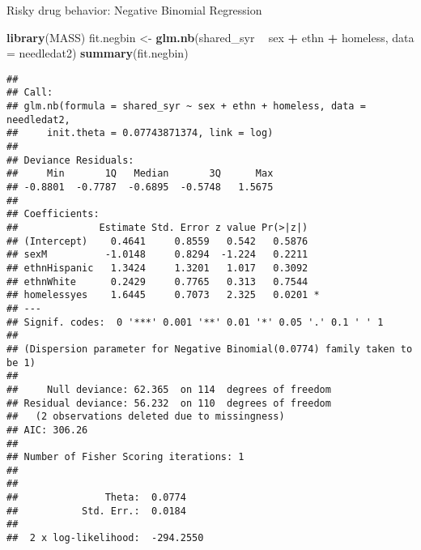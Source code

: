 \documentclass[
  ignorenonframetext,
]{beamer}
\newenvironment{Shaded}{\begin{snugshade}}{\end{snugshade}}
\newcommand{\DataTypeTok}[1]{\textcolor[rgb]{0.13,0.29,0.53}{#1}}
\newcommand{\KeywordTok}[1]{\textcolor[rgb]{0.13,0.29,0.53}{\textbf{#1}}}
\newcommand{\NormalTok}[1]{#1}
\newcommand{\OperatorTok}[1]{\textcolor[rgb]{0.81,0.36,0.00}{\textbf{#1}}}
\newcommand{\StringTok}[1]{\textcolor[rgb]{0.31,0.60,0.02}{#1}}
\begin{document}
\begin{frame}[fragile]{Risky drug behavior: Negative Binomial
Regression}
\protect\hypertarget{risky-drug-behavior-negative-binomial-regression}{}

\begin{Shaded}
\begin{Highlighting}[]
\KeywordTok{library}\NormalTok{(MASS)}
\NormalTok{fit.negbin <-}\StringTok{ }\KeywordTok{glm.nb}\NormalTok{(shared_syr }\OperatorTok{~}\StringTok{ }\NormalTok{sex }\OperatorTok{+}\StringTok{ }\NormalTok{ethn }\OperatorTok{+}\StringTok{ }\NormalTok{homeless,}
                     \DataTypeTok{data =}\NormalTok{ needledat2)}
\KeywordTok{summary}\NormalTok{(fit.negbin)}
\end{Highlighting}
\end{Shaded}

\begin{verbatim}
## 
## Call:
## glm.nb(formula = shared_syr ~ sex + ethn + homeless, data = needledat2, 
##     init.theta = 0.07743871374, link = log)
## 
## Deviance Residuals: 
##     Min       1Q   Median       3Q      Max  
## -0.8801  -0.7787  -0.6895  -0.5748   1.5675  
## 
## Coefficients:
##              Estimate Std. Error z value Pr(>|z|)  
## (Intercept)    0.4641     0.8559   0.542   0.5876  
## sexM          -1.0148     0.8294  -1.224   0.2211  
## ethnHispanic   1.3424     1.3201   1.017   0.3092  
## ethnWhite      0.2429     0.7765   0.313   0.7544  
## homelessyes    1.6445     0.7073   2.325   0.0201 *
## ---
## Signif. codes:  0 '***' 0.001 '**' 0.01 '*' 0.05 '.' 0.1 ' ' 1
## 
## (Dispersion parameter for Negative Binomial(0.0774) family taken to be 1)
## 
##     Null deviance: 62.365  on 114  degrees of freedom
## Residual deviance: 56.232  on 110  degrees of freedom
##   (2 observations deleted due to missingness)
## AIC: 306.26
## 
## Number of Fisher Scoring iterations: 1
## 
## 
##               Theta:  0.0774 
##           Std. Err.:  0.0184 
## 
##  2 x log-likelihood:  -294.2550
\end{verbatim}

\end{frame}
\end{document}

